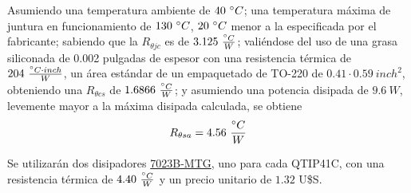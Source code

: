 Asumiendo una temperatura ambiente de $40 \ \degree C$; una temperatura máxima de juntura en funcionamiento de $130 \ \degree C$, $20 \ \degree C$ menor a la especificada por el fabricante; sabiendo que la $R_{\theta jc}$ es de $3.125 \ \frac{\degree C}{W}$; valiéndose del uso de una grasa siliconada de 0.002 pulgadas de espesor con una resistencia térmica de $204 \ \frac{\degree C \cdot inch}{W}$, un área estándar de un empaquetado de TO-220 de $0.41\cdot 0.59 \ inch^2$, obteniendo una $R_{\theta cs}$ de $1.6866 \ \frac{\degree C}{W}$; y asumiendo  una potencia disipada de $9.6 \ W$, levemente mayor a la máxima disipada calculada, se obtiene
\begin{equation}
R_{\theta sa} = 4.56 \ \frac{\degree C}{W}
\end{equation}

Se utilizarán dos disipadores \href{https://www.digikey.com/product-detail/en/aavid-thermal-division-of-boyd-corporation/7023B-MTG/HS410-ND/1625509}{7023B-MTG}, uno para cada QTIP41C, con una resistencia térmica de $4.40 \ \frac{\degree C}{W}$ y un precio unitario de $1.32$ U\$S.



